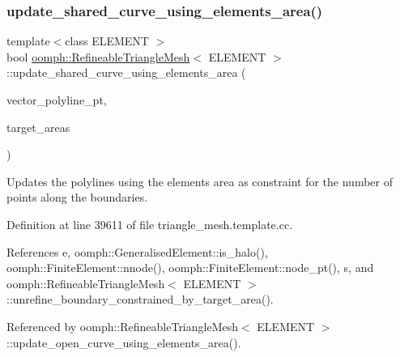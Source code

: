 \subsubsection{\texorpdfstring{update\+\_\+shared\+\_\+curve\+\_\+using\+\_\+elements\+\_\+area()}{update\_shared\_curve\_using\_elements\_area()}}
{\footnotesize\ttfamily template$<$class E\+L\+E\+M\+E\+NT $>$ \\
bool \hyperlink{classoomph_1_1RefineableTriangleMesh}{oomph\+::\+Refineable\+Triangle\+Mesh}$<$ E\+L\+E\+M\+E\+NT $>$\+::update\+\_\+shared\+\_\+curve\+\_\+using\+\_\+elements\+\_\+area (\begin{DoxyParamCaption}\item[{\hyperlink{classoomph_1_1Vector}{Vector}$<$ \hyperlink{classoomph_1_1TriangleMeshPolyLine}{Triangle\+Mesh\+Poly\+Line} $\ast$$>$ \&}]{vector\+\_\+polyline\+\_\+pt,  }\item[{const \hyperlink{classoomph_1_1Vector}{Vector}$<$ double $>$ \&}]{target\+\_\+areas }\end{DoxyParamCaption})\hspace{0.3cm}{\ttfamily [protected]}}



Updates the polylines using the elements area as constraint for the number of points along the boundaries. 



Definition at line 39611 of file triangle\+\_\+mesh.\+template.\+cc.



References e, oomph\+::\+Generalised\+Element\+::is\+\_\+halo(), oomph\+::\+Finite\+Element\+::nnode(), oomph\+::\+Finite\+Element\+::node\+\_\+pt(), s, and oomph\+::\+Refineable\+Triangle\+Mesh$<$ E\+L\+E\+M\+E\+N\+T $>$\+::unrefine\+\_\+boundary\+\_\+constrained\+\_\+by\+\_\+target\+\_\+area().



Referenced by oomph\+::\+Refineable\+Triangle\+Mesh$<$ E\+L\+E\+M\+E\+N\+T $>$\+::update\+\_\+open\+\_\+curve\+\_\+using\+\_\+elements\+\_\+area().

\mbox{\label{classoomph_1_1RefineableTriangleMesh_ae2f0885e6e3fc4c0566986d9c8d2fe65}} 
